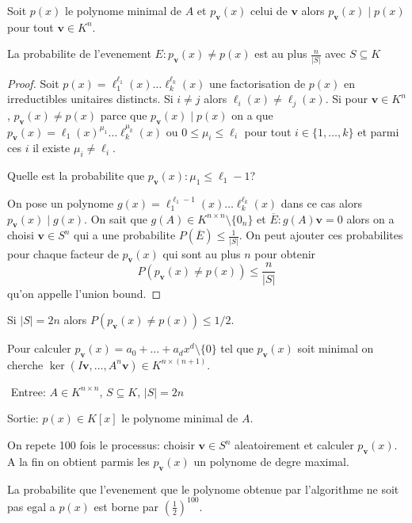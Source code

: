 Soit $p(x)$ le polynome minimal de $A$ et $p_{\boldsymbol{v}}(x)$ celui de $\boldsymbol{v}$ alors $p_{\boldsymbol{v}}(x)\mid p(x)$ pour tout $\boldsymbol{v}\in K^{n}$. 
\begin{theorem}
La probabilite de l'evenement $E:p_{\boldsymbol{v}}(x)\neq p(x)$ est au plus $\frac{n}{|S|}$ avec $S\subseteq K$
\end{theorem}
\begin{proof}
Soit $p(x)=\ell_{1}^{\ell_{1}}(x)\dots \ell _{k}^{\ell _{k}}(x)$ une factorisation de $p(x)$ en irreductibles unitaires distincts. Si $i\neq j$ alors $\ell _{i}(x)\neq \ell _{j}(x)$. Si pour $\boldsymbol{v}\in K^{n}$, $p_{\boldsymbol{v}}(x)\neq p(x)$ parce que $p_{\boldsymbol{v}}(x)\mid p(x)$ on a que $p_{\boldsymbol{v}}(x)=\ell_{1}(x)^{\mu_{1}}\dots \ell _{k}^{\mu _{k}}(x)$ ou $0\le \mu _{i}\le \ell _{i}$ pour tout $i\in \{ 1,\dots,k \}$ et parmi ces $i$ il existe $\mu _{i}\neq \ell _{i}$.

Quelle est la probabilite que $p_{\boldsymbol{v}}(x):\mu _{1}\le \ell_{1}-1$?

On pose un polynome $g(x)=\ell_{1}^{\ell_{1}-1}(x)\dots \ell _{k}^{\ell _{k}}(x)$ dans ce cas alors $p_{\boldsymbol{v}}(x)\mid g(x)$. On sait que $g(A)\in K^{n\times n}\setminus \{ 0_{n} \}$ et $\overline{E}:g(A)\boldsymbol{v}=0$ alors on a choisi $\boldsymbol{v}\in S^{n}$ qui a une probabilite $P(\overline{E})\le\frac{1}{|S|}$. On peut ajouter ces probabilites pour chaque facteur de $p_{\boldsymbol{v}}(x)$ qui sont au plus $n$ pour obtenir $$P(p_{\boldsymbol{v}}(x)\neq p(x))\le \frac{n}{|S|}$$ qu'on appelle l'union bound. 
\end{proof}
\begin{corollary}
Si $|S|=2n$ alors $P(p_{\boldsymbol{v}}(x)\neq p(x))\le 1/2$.
\end{corollary}

Pour calculer $p_{\boldsymbol{v}}(x)=a_{0}+\dots+a_{d}x^{d}\setminus \{ 0 \}$ tel que $p_{\boldsymbol{v}}(x)$ soit minimal on cherche $\ker(I\boldsymbol{v},\dots,A^{n}\boldsymbol{v})\in K^{n\times(n+1)}$.

\begin{proposition}[Algorithme] \(\) \newline
\noindent Entree: $A\in K^{n\times n}$, $S\subseteq K$, $|S|=2n$

\noindent Sortie: $p(x)\in K[x]$ le polynome minimal de $A$.

On repete 100 fois le processus: choisir $\boldsymbol{v}\in S^{n}$ aleatoirement et calculer $p_{\boldsymbol{v}}(x)$. A la fin on obtient parmis les $p_{\boldsymbol{v}}(x)$ un polynome de degre maximal.
\end{proposition}
\begin{theorem}
La probabilite que l'evenement que le polynome obtenue par l'algorithme ne soit pas egal a $p(x)$ est borne par $\left( \frac{1}{2} \right)^{100}$.
\end{theorem}